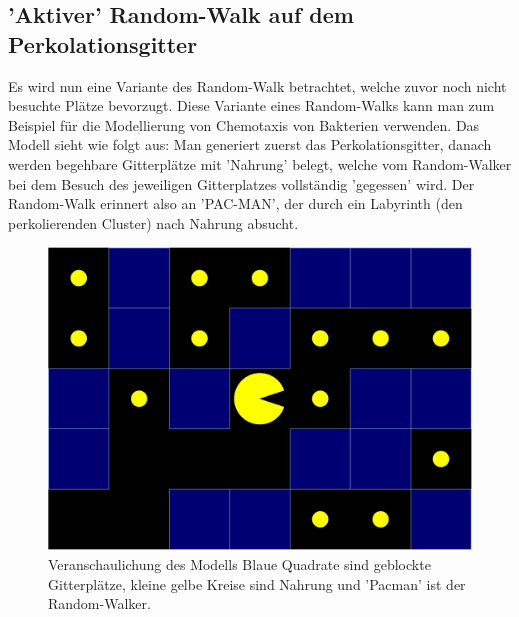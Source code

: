\documentclass[a4paper, 12pt]{report}
\begin{document}
\clearpage

\subsection{'Aktiver' Random-Walk auf dem Perkolationsgitter}
Es wird nun eine Variante des Random-Walk betrachtet, welche zuvor noch nicht besuchte Plätze bevorzugt. Diese Variante eines Random-Walks kann man zum Beispiel für die Modellierung von Chemotaxis von Bakterien verwenden. Das Modell sieht wie folgt aus: Man generiert zuerst das Perkolationsgitter, danach werden begehbare Gitterplätze mit 'Nahrung' belegt, welche vom Random-Walker bei dem Besuch des jeweiligen Gitterplatzes vollständig 'gegessen' wird. Der Random-Walk erinnert also an 'PAC-MAN', der durch ein Labyrinth (den perkolierenden Cluster) nach Nahrung absucht.
\begin{figure}[h!]
	\centering
	\includegraphics[scale=0.25]{pacman.png}
	\caption{Veranschaulichung des Modells \break Blaue Quadrate sind geblockte Gitterplätze, kleine gelbe Kreise sind Nahrung und 'Pacman' ist der Random-Walker\cite{doi:10.1063/1.4999485}.}
\end{figure}
\newpage
\end{document}
